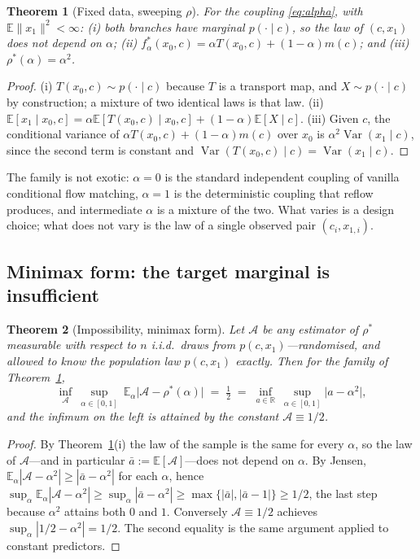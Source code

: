 \documentclass{article}
\theoremstyle{plain}
\newtheorem{theorem}{Theorem}
\newcommand{\Real}{\mathbb{R}}
\newcommand{\Var}{\operatorname{Var}}
\newcommand{\Eop}{\mathbb{E}}
\begin{document}
\begin{theorem}[Fixed data, sweeping $\rho$]
\label{thm:alpha}
For the coupling \eqref{eq:alpha}, with $\Eop\|x_1\|^2<\infty$: \emph{(i)} both branches have marginal
$p(\cdot\mid c)$, so the law of $(c,x_1)$ does not depend on $\alpha$; \emph{(ii)}
$f^\ast_\alpha(x_0,c)=\alpha T(x_0,c)+(1-\alpha)m(c)$; and \emph{(iii)}
$\rho^\ast(\alpha)=\alpha^2$.
\end{theorem}
\begin{proof}
(i) $T(x_0,c)\sim p(\cdot\mid c)$ because $T$ is a transport map, and
$X\sim p(\cdot\mid c)$ by construction; a mixture of two identical laws is that law.
(ii) $\Eop[x_1\mid x_0,c]=\alpha\Eop[T(x_0,c)\mid x_0,c]+(1-\alpha)\Eop[X\mid c]$.
(iii) Given $c$, the conditional variance of $\alpha T(x_0,c)+(1-\alpha)m(c)$ over
$x_0$ is $\alpha^2\Var(x_1\mid c)$, since the second term is constant and
$\Var(T(x_0,c)\mid c)=\Var(x_1\mid c)$.
\end{proof}

The family is not exotic: $\alpha=0$ is the standard independent coupling of vanilla
conditional flow matching, $\alpha=1$ is the deterministic coupling that reflow
produces, and intermediate $\alpha$ is a mixture of the two. What varies is a design
choice; what does not vary is the law of a single observed pair $(c_i,x_{1,i})$.

\subsection{Minimax form: the target marginal is insufficient}
\label{sec:minimax}

\begin{theorem}[Impossibility, minimax form]
\label{thm:minimax}
Let $\mathcal A$ be any estimator of $\rho^\ast$ measurable with respect to $n$
i.i.d.\ draws from $p(c,x_1)$---randomised, and allowed to know the population law
$p(c,x_1)$ exactly. Then for the family of Theorem~\ref{thm:alpha},
\[
  \inf_{\mathcal A}\ \sup_{\alpha\in[0,1]}\ \Eop_\alpha\big|\mathcal A-\rho^\ast(\alpha)\big|
  \;=\; \tfrac12 \;=\; \inf_{a\in\Real}\ \sup_{\alpha\in[0,1]}\big|a-\alpha^2\big| ,
\]
and the infimum on the left is attained by the constant $\mathcal A\equiv1/2$.
\end{theorem}
\begin{proof}
By Theorem~\ref{thm:alpha}(i) the law of the sample is the same for every $\alpha$, so
the law of $\mathcal A$---and in particular $\bar a:=\Eop[\mathcal A]$---does not
depend on $\alpha$. By Jensen,
$\Eop_\alpha|\mathcal A-\alpha^2|\ge|\bar a-\alpha^2|$ for each $\alpha$, hence
$\sup_\alpha\Eop_\alpha|\mathcal A-\alpha^2|\ge\sup_\alpha|\bar a-\alpha^2|
\ge\max\{|\bar a|,|\bar a-1|\}\ge1/2$, the last step because $\alpha^2$ attains both
$0$ and $1$. Conversely $\mathcal A\equiv1/2$ achieves
$\sup_{\alpha}|1/2-\alpha^2|=1/2$. The second equality is the same argument applied to
constant predictors.
\end{proof}
\end{document}
